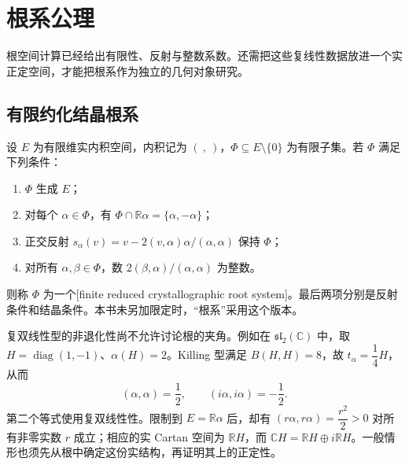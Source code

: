 
\section{根系公理}
\label{b5:sec:1604}

根空间计算已经给出有限性、反射与整数系数。还需把这些复线性数据放进一个实正定空间，才能把根系作为独立的几何对象研究。


%
%

\subsection{有限约化结晶根系}
\label{b5:subsec:1604:01}

\begin{definition}\label{b5:def:finite-root-system}
	设 \(E\) 为有限维实内积空间，内积记为 \((\ ,\ )\)，\(\Phi\subseteq E\setminus\{0\}\) 为有限子集。若 \(\Phi\) 满足下列条件：
	\begin{enumerate}
		\item \(\Phi\) 生成 \(E\)；
		\item 对每个 \(\alpha\in\Phi\)，有 \(\Phi\cap\mathbb R\alpha=\{\alpha,-\alpha\}\)；
		\item 正交反射 \(s_\alpha(v)=v-2(v,\alpha)\alpha/(\alpha,\alpha)\) 保持 \(\Phi\)；
		\item 对所有 \(\alpha,\beta\in\Phi\)，数 \(2(\beta,\alpha)/(\alpha,\alpha)\) 为整数。
	\end{enumerate}
	则称 \(\Phi\) 为一个[finite reduced crystallographic root system]。最后两项分别是反射条件和结晶条件。本书未另加限定时，“根系”采用这个版本。
\end{definition}

复双线性型的非退化性尚不允许讨论根的夹角。例如在 \(\mathfrak{sl}_2(\mathbb C)\) 中，取 \(H=\operatorname{diag}(1,-1)\)、\(\alpha(H)=2\)。Killing 型满足 \(B(H,H)=8\)，故 \(t_\alpha=\dfrac14H\)，从而
\[
	(\alpha,\alpha)=\frac12,\qquad (i\alpha,i\alpha)=-\frac12.
\]
第二个等式使用复双线性性。限制到 \(E=\mathbb R\alpha\) 后，却有 \((r\alpha,r\alpha)=\dfrac{r^2}{2}>0\) 对所有非零实数 \(r\) 成立；相应的实 Cartan 空间为 \(\mathbb RH\)，而 \(\mathbb CH=\mathbb RH\oplus i\mathbb RH\)。一般情形也须先从根中确定这份实结构，再证明其上的正定性。

